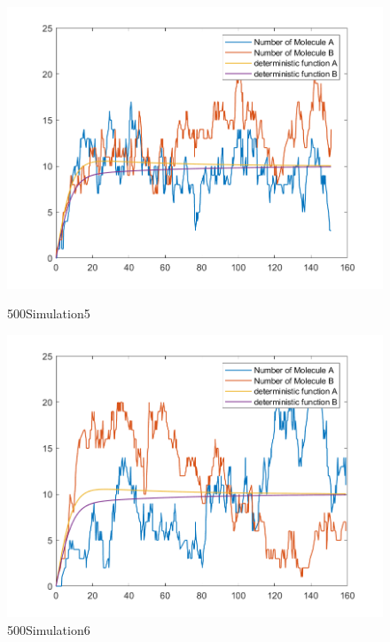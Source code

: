\documentclass{article}
\begin{document}
\begin{figure}[htbp]
    \centering
    \begin{minipage}{0.45\linewidth}
        \centering
        \includegraphics[width=\linewidth]{graph/a5.png}
        \caption{500Simulation5}
        \label{a5}
    \end{minipage}
    \hfill
    \begin{minipage}{0.45\linewidth}
        \centering
        \includegraphics[width=\linewidth]{graph/a6.png}
        \caption{500Simulation6}
        \label{a6}
    \end{minipage}
\end{figure}
\end{document}
